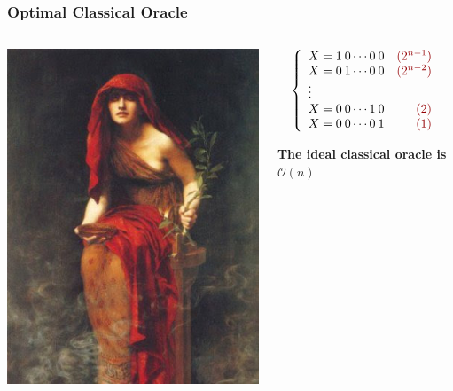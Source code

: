 \documentclass[aspectratio=169,11pt,hyperref={colorlinks=true}]{beamer}
\begin{document}
\begin{frame}
    \frametitle{Optimal Classical Oracle}
	\begin{columns}
        \begin{column}{.3\textwidth}
            \centering
            \includegraphics[width=\textwidth]{the_oracle.jpg}
        \end{column}
        \begin{column}{.7\textwidth}
            \begin{flushleft}
            \[\left \{
                \begin{array}{lr}
                    X = 1\>0 \dotsb 0\>0 & \color{openstack} (2^{n-1})\\
                    X = 0\>1 \dotsb 0\>0 & \color{openstack} (2^{n-2})\\
                   \vdots  \\
                    X = 0\>0 \dotsb 1\>0 & \color{openstack} (2)\\
                    X = 0\>0 \dotsb 0\>1  & \color{openstack} (1)
                 \end{array}
               \right.
           \]
            \end{flushleft}
            \begin{center}
            \large \textbf{The ideal classical oracle is $\mathcal{O}(n)$}
            \end{center}
        \end{column}
    \end{columns}
\end{frame}
\end{document}
